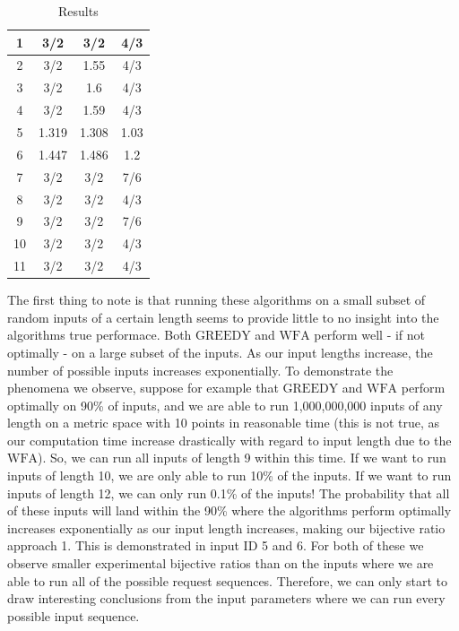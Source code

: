 \begin{table}[!htb]
\begin{minipage}{.5\linewidth}
\begin{tabular}{|c|c|c|c|}
          1 & 3/2 & 3/2 & 4/3\\
          \hline
          2 & 3/2 & 1.55 & 4/3\\
          \hline
          3 & 3/2 & 1.6 & 4/3 \\
          \hline
          4 & 3/2 & 1.59 & 4/3 \\
          \hline
          5 & 1.319 & 1.308 & 1.03 \\
          \hline
          6 & 1.447 & 1.486 & 1.2 \\
          \hline
          7 & 3/2 & 3/2 & 7/6 \\
          \hline
          8 & 3/2 & 3/2 & 4/3 \\
          \hline
          9 & 3/2 & 3/2 & 7/6 \\
          \hline
          10 & 3/2 & 3/2 & 4/3 \\
          \hline
          11 & 3/2 & 3/2 & 4/3 \\
          \hline

      \end{tabular}
          \caption{Results}
          \label{tab:results}
    \end{minipage} 
\end{table}

The first thing to note is that running these algorithms on a small subset of random inputs of a certain length seems to provide little to no insight into the algorithms true performace. Both $\mathrm{GREEDY}$ and $\mathrm{WFA}$ perform well - if not optimally - on a large subset of the inputs. As our input lengths increase, the number of possible inputs increases exponentially. To demonstrate the phenomena we observe, suppose for example that $\mathrm{GREEDY}$ and $\mathrm{WFA}$ perform optimally on 90\% of inputs, and we are able to run 1,000,000,000 inputs of any length on a metric space with 10 points in reasonable time (this is not true, as our computation time increase drastically with regard to input length due to the $\mathrm{WFA}$). So, we can run all inputs of length 9 within this time. If we want to run inputs of length 10, we are only able to run 10\% of the inputs. If we want to run inputs of length 12, we can only run 0.1\% of the inputs! The probability that all of these inputs will land within the 90\% where the algorithms perform optimally increases exponentially as our input length increases, making our bijective ratio approach 1. This is demonstrated in input ID 5 and 6. For both of these we observe smaller experimental bijective ratios than on the inputs where we are able to run all of the possible request sequences. Therefore, we can only start to draw interesting conclusions from the input parameters where we can run every possible input sequence.


